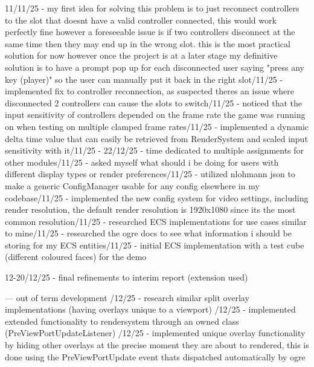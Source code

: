 \documentclass[]{final_report}
\begin{document}
11/11/25 - my first idea for solving this problem is to just reconnect controllers to the slot that doesnt have a valid controller connected, this would work perfectly fine however a foreseeable issue is if two controllers disconnect at the same time then they may end up in the wrong slot. this is the most practical solution for now however once the project is at a later stage my definitive solution is to have a prompt pop up for each disconnected user saying "press any key (player)" so the user can manually put it back in the right slot/11/25 - implemented fix to controller reconnection, as suspected theres an issue where disconnected 2 controllers can cause the slots to switch/11/25 - noticed that the input sensitivity of controllers depended on the frame rate the game was running on when testing on multiple clamped frame rates/11/25 - implemented a dynamic delta time value that can easily be retrieved from RenderSystem and scaled input sensitivity with it/11/25 - 22/12/25 - time dedicated to multiple assignments for other modules/11/25 - asked myself what should i be doing for users with different display types or render preferences/11/25 - utilized nlohmann json to make a generic ConfigManager usable for any config elsewhere in my codebase/11/25 - implemented the new config system for video settings, including render resolution, the default render resolution is 1920x1080 since its the most common resolution/11/25 - researched ECS implementations for use cases similar to mine/11/25 - researched the ogre docs to see what information i should be storing for my ECS entities/11/25 - initial ECS implementation with a test cube (different coloured faces) for the demo\newline

12-20/12/25 - final refinements to interim report (extension used)\newline

--- out of term development /12/25 - research similar split overlay implementations (having overlays unique to a viewport) /12/25 - implemented extended functionality to rendersystem through an owned class (PreViewPortUpdateListener) /12/25 - implemented unique overlay functionality by hiding other overlays at the precise moment they are about to rendered, this is done using the PreViewPortUpdate event thats dispatched automatically by ogre \newline
\end{document}
